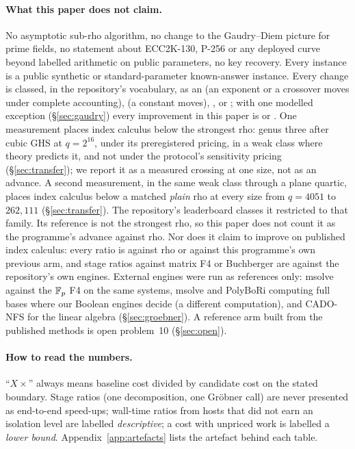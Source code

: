 \paragraph{What this paper does not claim.} No asymptotic sub-rho
algorithm, no change to the Gaudry--Diem picture for prime fields, no
statement about ECC2K-130, P-256 or any deployed curve beyond labelled
arithmetic on public parameters, no key recovery. Every instance is a
public synthetic or standard-parameter known-answer instance. Every change
is classed, in the repository's vocabulary, as an  (an
exponent or a crossover moves under complete accounting),
 (a constant moves), , or
; with one modelled exception (\S\ref{sec:gaudry}) every
improvement in this paper is  or . One
measurement places index calculus below the strongest rho: genus three
after cubic GHS at $q=2^{16}$, under its preregistered pricing, in a weak
class where theory predicts it, and not under the protocol's sensitivity
pricing (\S\ref{sec:transfer}); we report it as a measured crossing at one
size, not as an advance. A second measurement, in the same weak class
through a plane quartic, places index calculus below a matched \emph{plain}
rho at every size from $q=4051$ to $262{,}111$ (\S\ref{sec:transfer}). The
repository's leaderboard classes it  restricted to that family.
Its reference is not the strongest rho, so this paper does not count it as
the programme's advance against rho.
Nor does it claim to improve on published index calculus: every ratio is
against rho or against this programme's own previous arm, and stage ratios
against matrix F4 or Buchberger are against the repository's own engines.
External engines were run as references only: msolve against the $\mathbb{F}_p$ F4
on the same systems, msolve and PolyBoRi computing full bases where our
Boolean engines decide (a different computation), and CADO-NFS for the
linear algebra (\S\ref{sec:groebner}). A reference arm built from the published methods is open
problem~10 (\S\ref{sec:open}).

\paragraph{How to read the numbers.} ``$X\times$'' always means
baseline cost divided by candidate cost on the stated boundary. Stage
ratios (one decomposition, one Gr\"obner call) are never presented as
end-to-end speed-ups; wall-time ratios from hosts that did not earn an
isolation level are labelled \emph{descriptive}; a cost with unpriced work
is labelled a \emph{lower bound}. Appendix~\ref{app:artefacts} lists the
artefact behind each table.
